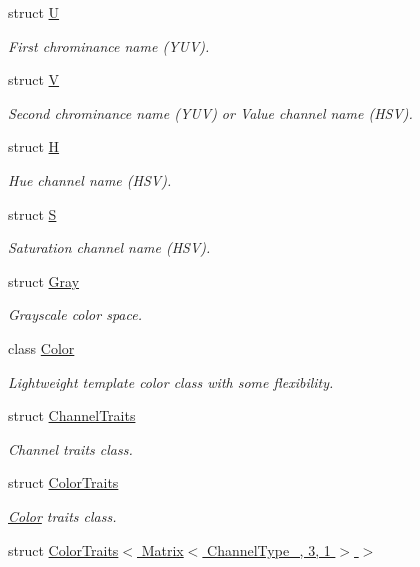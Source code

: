 \begin{DoxyCompactItemize}
struct \hyperlink{struct_d_o_1_1_u}{U}
\begin{DoxyCompactList}\small\item\em First chrominance name (Y\-U\-V). \end{DoxyCompactList}\item 
struct \hyperlink{struct_d_o_1_1_v}{V}
\begin{DoxyCompactList}\small\item\em Second chrominance name (Y\-U\-V) or Value channel name (H\-S\-V). \end{DoxyCompactList}\item 
struct \hyperlink{struct_d_o_1_1_h}{H}
\begin{DoxyCompactList}\small\item\em Hue channel name (H\-S\-V). \end{DoxyCompactList}\item 
struct \hyperlink{struct_d_o_1_1_s}{S}
\begin{DoxyCompactList}\small\item\em Saturation channel name (H\-S\-V). \end{DoxyCompactList}\item 
struct \hyperlink{struct_d_o_1_1_gray}{Gray}
\begin{DoxyCompactList}\small\item\em Grayscale color space. \end{DoxyCompactList}\item 
class \hyperlink{class_d_o_1_1_color}{Color}
\begin{DoxyCompactList}\small\item\em Lightweight template color class with some flexibility. \end{DoxyCompactList}\item 
struct \hyperlink{struct_d_o_1_1_channel_traits}{Channel\-Traits}
\begin{DoxyCompactList}\small\item\em Channel traits class. \end{DoxyCompactList}\item 
struct \hyperlink{struct_d_o_1_1_color_traits}{Color\-Traits}
\begin{DoxyCompactList}\small\item\em \hyperlink{class_d_o_1_1_color}{Color} traits class. \end{DoxyCompactList}\item 
struct \hyperlink{struct_d_o_1_1_color_traits_3_01_matrix_3_01_channel_type___00_013_00_011_01_4_01_4}{Color\-Traits$<$ Matrix$<$ Channel\-Type\-\_\-, 3, 1 $>$ $>$}

\end{DoxyCompactItemize}
